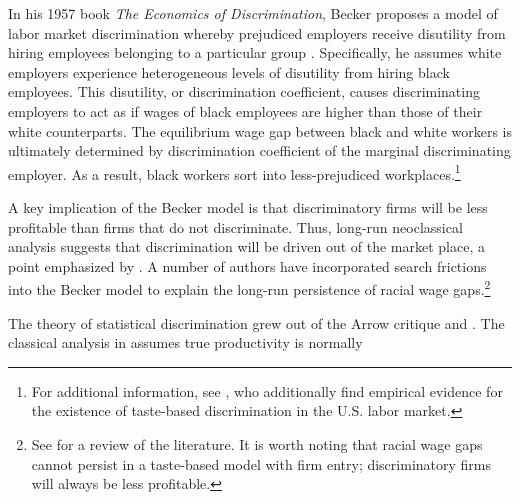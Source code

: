 \documentclass[10 pt]{article}
\begin{document}
\begin{outline}


In his 1957 book \emph{The Economics of Discrimination}, Becker proposes a model of labor market discrimination whereby prejudiced employers receive disutility from hiring employees belonging to a particular group \parencite{B57}.
Specifically, he assumes white employers experience heterogeneous levels of disutility from hiring black employees. 
This disutility, or discrimination coefficient, causes discriminating employers to act as if wages of black employees are higher than those of their white counterparts.
The equilibrium wage gap between black and white workers is ultimately determined by discrimination coefficient of the marginal discriminating employer.
As a result, black workers sort into less-prejudiced workplaces.\footnote{
For additional information, see \textcite{CG08}, who additionally find empirical evidence for the existence of taste-based discrimination in the U.S. labor market.
} 

A key implication of the Becker model is that discriminatory firms will be less profitable than firms that do not discriminate. 
Thus, long-run neoclassical analysis suggests that discrimination will be driven out of the market place, a point emphasized by \textcite{A72}.
A number of authors have incorporated search frictions into the Becker model to explain the long-run persistence of racial wage gaps.\footnote{
    See \textcite{LL12} for a review of the literature.
    It is worth noting that racial wage gaps cannot persist in a taste-based model with firm entry; discriminatory firms will always be less profitable. 
}


The theory of statistical discrimination grew out of the Arrow critique  and \textcite{P72}.
The classical analysis in \textcite{AC77} assumes true productivity is normally 


\end{outline}

\end{document}
